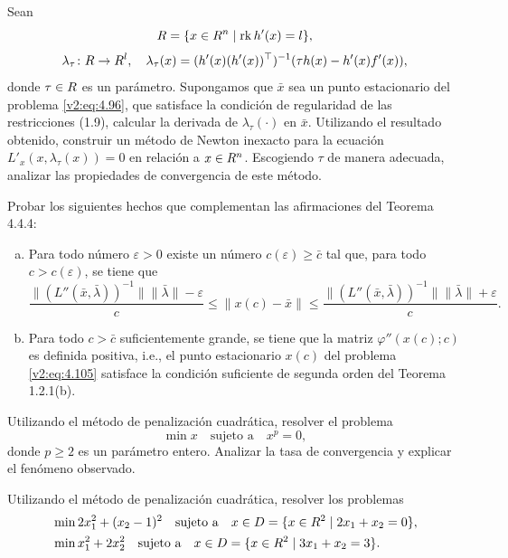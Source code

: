 \begin{exercise}\label{v2:ejer:4.4.2}
    Sean
    \[
        R = \{x \in R^n \mid \operatorname{rk} h'(x) = l\},
    \]
    \[
        \lambda_\tau \colon R \to R^l, \quad \lambda_\tau(x) = (h'(x)(h'(x))^\top)^{-1}(\tau h(x) - h'(x)f'(x)),
    \]
    donde $\tau \in R$ es un parámetro. Supongamos que $\bar{x}$ sea un punto estacionario del problema \eqref{v2:eq:4.96}, que satisface la condición de regularidad de las restricciones (1.9), calcular la derivada de $\lambda_\tau(\cdot)$ en $\bar{x}$. Utilizando el resultado obtenido, construir un método de Newton inexacto para la ecuación $L'_x(x, \lambda_\tau(x)) = 0$ en relación a $x \in R^n$. Escogiendo $\tau$ de manera adecuada, analizar las propiedades de convergencia de este método.
\end{exercise}

\begin{exercise}\label{v2:ejer:4.4.3}
    Probar los siguientes hechos que complementan las afirmaciones del Teorema 4.4.4:
    \begin{enumerate}[(a)]
        \item Para todo número $\varepsilon > 0$ existe un número $c(\varepsilon) \ge \bar{c}$ tal que, para todo $c > c(\varepsilon)$, se tiene que
        \[
            \frac{\|(L''(\bar{x}, \bar{\lambda}))^{-1}\| \|\bar{\lambda}\| - \varepsilon}{c} \le \|x(c) - \bar{x}\| \le \frac{\|(L''(\bar{x}, \bar{\lambda}))^{-1}\| \|\bar{\lambda}\| + \varepsilon}{c}.
        \]
        \item Para todo $c > \bar{c}$ suficientemente grande, se tiene que la matriz $\varphi''(x(c); c)$ es definida positiva, i.e., el punto estacionario $x(c)$ del problema \eqref{v2:eq:4.105} satisface la condición suficiente de segunda orden del Teorema 1.2.1(b).
    \end{enumerate}
\end{exercise}

\begin{exercise}\label{v2:ejer:4.4.4}
    Utilizando el método de penalización cuadrática, resolver el problema
    \[
        \min x \quad \text{sujeto a} \quad x^p = 0,
    \]
    donde $p \ge 2$ es un parámetro entero. Analizar la tasa de convergencia y explicar el fenómeno observado.
\end{exercise}

\begin{exercise}\label{v2:ejer:4.4.5}
    Utilizando el método de penalización cuadrática, resolver los problemas
    \begin{align*}
        &\min 2x_1^2 + (x_2 - 1)^2 \quad \text{sujeto a} \quad x \in D = \{x \in R^2 \mid 2x_1 + x_2 = 0\}, \\
        &\min x_1^2 + 2x_2^2 \quad \text{sujeto a} \quad x \in D = \{x \in R^2 \mid 3x_1 + x_2 = 3\}.
    \end{align*}
\end{exercise}

